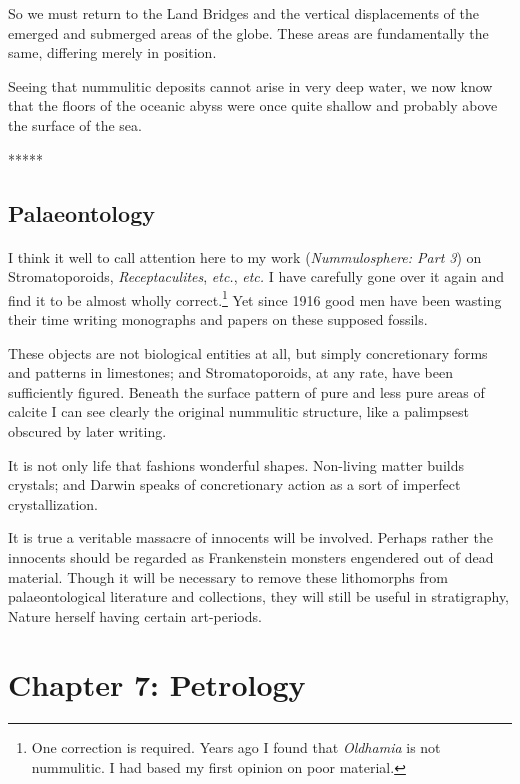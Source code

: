 \documentclass[a4paper, 12pt, oneside]{article}
\begin{document}
So we must return to the Land Bridges and the vertical displacements of the emerged and submerged areas of the globe. These areas are fundamentally the same, differing merely in position.

Seeing that nummulitic deposits cannot arise in very deep water, we now know that the floors of the oceanic abyss were once quite shallow and probably above the surface of the sea.

\centerline{*\hspace{15mm}*\hspace{15mm}*\hspace{15mm}*\hspace{15mm}*}
\bigskip

\subsection{Palaeontology}
\paragraph{}
I think it well to call attention here to my work (\emph{Nummulosphere: Part 3}) on Stromatoporoids, \emph{Receptaculites}, \emph{etc.}, \emph{etc.} I have carefully gone over it again and find it to be almost wholly correct.\footnote{One correction is required. Years ago I found that \emph{Oldhamia} is not nummulitic. I had based my first opinion on poor material.} Yet since 1916 good men have been wasting their time writing monographs and papers on these supposed fossils.

These objects are not biological entities at all, but simply concretionary forms and patterns in limestones; and Stromatoporoids, at any rate, have been sufficiently figured. Beneath the surface pattern of pure and less pure areas of calcite I can see clearly the original nummulitic structure, like a palimpsest obscured by later writing.

It is not only life that fashions wonderful shapes. Non-living matter builds crystals; and Darwin speaks of concretionary action as a sort of imperfect crystallization.

It is true a veritable massacre of innocents will be involved. Perhaps rather the innocents should be regarded as Frankenstein monsters engendered out of dead material. Though it will be necessary to remove these lithomorphs from palaeontological literature and collections, they will still be useful in stratigraphy, Nature herself having certain art-periods.
\clearpage
\section{Chapter 7: Petrology}
\end{document}
